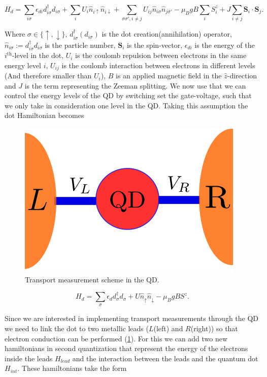 \[
H_{d}=\sum_{i\sigma}\epsilon_{di}d_{i\sigma}^{\dagger}d_{i\sigma}+\sum_{i}U_{i}\hat{n}_{i\uparrow}\hat{n}_{i\downarrow}+\sum_{\sigma\sigma',i\neq j}U_{ij}\hat{n}_{i\sigma}\hat{n}_{j\sigma'}-\mu_{B}gB\sum_{i}S_{i}^{z}+J\sum_{i\neq j}\mathbf{S}_{i}\cdot\mathbf{S}_{j}.
\]


Where $\sigma\in\{\uparrow,\downarrow\}$, $d_{i\sigma}^{\dagger}\left(d_{i\sigma}\right)$
is the dot creation(annihilation) operator,$\hat{n}_{i\sigma}:=d_{i\sigma}^{\dagger}d_{i\sigma}$
is the particle number, $\mathbf{S}_{i}$ is the spin-vector, $\epsilon_{di}$
is the energy of the $i^{\mbox{th}}$-level in the dot, $U_{i}$ is
the coulomb repulsion between electrons in the same energy level $i$,
$U_{ij}$ is the coulomb interaction between electrons in different
levels (And therefore smaller than $U_{i}$), \textbf{$B$} is an
applied magnetic field in the $\hat{z}$-direction and $J$ is the
term representing the Zeeman splitting. We now use that we can control
the energy levels of the QD by switching set the gate-voltage, such
that we only take in consideration one level in the QD. Taking this
assumption the dot Hamiltonian becomes \\

\begin{figure}[h]
\centering
\includegraphics[scale=0.45]{IMAGES/QD_transport.png}\caption{\label{QD-transport}Transport measurement scheme in the QD. }
\end{figure}


\[
H_{d}=\sum_{\sigma}\epsilon_{d}d_{\sigma}^{\dagger}d_{\sigma}+U\hat{n}_{\uparrow}\hat{n}_{\downarrow}-\mu_{B}gBS^{z}.
\]


Since we are interested in implementing transport measurements through
the QD we need to link the dot to two metallic leads ($L$(left) and
$R$(right)) so that electron conduction can be performed (\ref{QD-transport}).
For this we can add two new hamiltonians in second quantization that
represent the energy of the electrons inside the leads $H_{lead}$
and the interaction between the leads and the quantum dot $H_{int}$.
These hamiltonians take the form 

